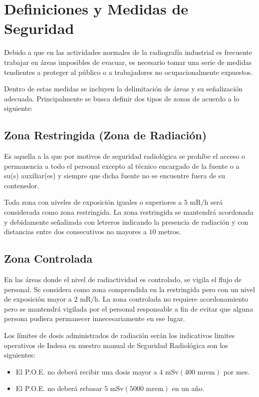 \section*{Definiciones y Medidas de Seguridad}

Debido a que en las actividades normales de la radiografía industrial es frecuente trabajar en áreas imposibles de evacuar, es necesario tomar una serie de medidas tendientes a proteger al público o a trabajadores no ocupacionalmente expuestos.

Dentro de estas medidas se incluyen la delimitación de áreas y su señalización adecuada. Principalmente se busca definir dos tipos de zonas de acuerdo a lo siguiente:

\subsection*{Zona Restringida (Zona de Radiación)}
Es aquella a la que por motivos de seguridad radiológica se prohíbe el acceso o permanencia a todo el personal excepto al técnico encargado de la fuente o a su(s) auxiliar(es) y siempre que dicha fuente no se encuentre fuera de su contenedor.

Toda zona con niveles de exposición iguales o superiores a $5 \text{ mR/h}$ será considerada como zona restringida. La zona restringida se mantendrá acordonada y debidamente señalizada con letreros indicando la presencia de radiación y con distancias entre dos consecutivos no mayores a $10$ metros.

\subsection*{Zona Controlada}
En las áreas donde el nivel de radiactividad es controlado, se vigila el flujo de personal. Se considera como zona comprendida en la restringida pero con un nivel de exposición mayor a $2 \text{ mR/h}$. La zona controlada no requiere acordonamiento pero se mantendrá vigilada por el personal responsable a fin de evitar que alguna persona pudiera permanecer innecesariamente en ese lugar.

Los límites de dosis administrados de radiación serán los indicativos limites operativos de Indesa en nuestro manual de Seguridad Radiológica son los siguientes:
\begin{itemize}
  \item El P.O.E. no deberá recibir una dosis mayor a $4 \text{ mSv} (400 \text{ mrem})$ por mes.
  \item El P.O.E. no deberá rebasar $5 \text{ mSv} (5000 \text{ mrem})$ en un año.
\end{itemize}

